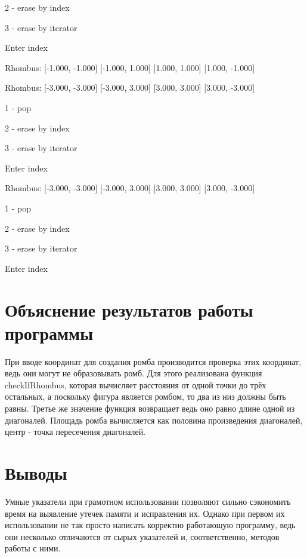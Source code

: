 \documentclass[a4paper, 12pt]{article}
\begin{document}
2 - erase by index

3 - erase by iterator

Enter index

Rhombus: [-1.000, -1.000] [-1.000, 1.000] [1.000, 1.000] [1.000, -1.000] 

Rhombus: [-3.000, -3.000] [-3.000, 3.000] [3.000, 3.000] [3.000, -3.000] 

1 - pop

2 - erase by index

3 - erase by iterator

Enter index

Rhombus: [-3.000, -3.000] [-3.000, 3.000] [3.000, 3.000] [3.000, -3.000] 

1 - pop

2 - erase by index

3 - erase by iterator

Enter index
\newpage

\section{Объяснение результатов работы программы}

При вводе координат для создания ромба производится проверка этих координат, ведь они могут не образовывать ромб. Для этого реализована функция checkIfRhombus, которая вычисляет расстояния от одной точки до трёх остальных, а поскольку фигура является ромбом, то два из низ должны быть равны. Третье же значение функция возвращает ведь оно равно длине одной из диагоналей. Площадь ромба вычисляется как половина произведения диагоналей, центр - точка пересечения диагоналей.   

\newpage
\section{Выводы}

Умные указатели при грамотном использовании позволяют сильно сэкономить время на выявление утечек памяти и исправления их. Однако при первом их использовании не так просто написать корректно работающую программу, ведь они несколько отличаются от сырых указателей и, соответственно, методов работы с ними.
\end{document}
